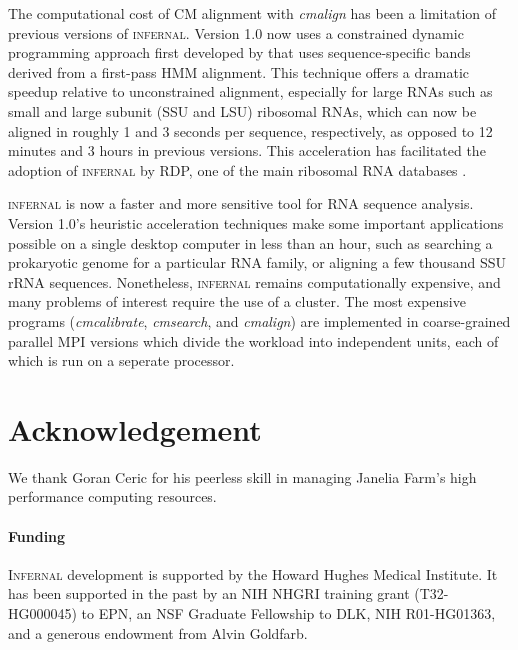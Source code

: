 \documentclass{bioinfo}
\begin{document}
\begin{application}
The computational cost of CM alignment with \emph{cmalign} has been a
limitation of previous versions of \textsc{infernal}. Version 1.0 now
uses a constrained dynamic programming approach first developed by
\citet{Brown00} that uses sequence-specific bands derived from a
first-pass HMM alignment. This technique offers a dramatic speedup
relative to unconstrained alignment, especially for large RNAs such as
small and large subunit (SSU and LSU) ribosomal RNAs, which can now be
aligned in roughly 1 and 3 seconds per sequence, respectively, as
opposed to 12 minutes and 3 hours in previous versions.  This
acceleration has facilitated the adoption of \textsc{infernal} by RDP,
one of the main ribosomal RNA databases \citep{Cole09}.

\textsc{infernal} is now a faster and more sensitive tool for RNA
sequence analysis.  Version 1.0's heuristic acceleration techniques
make some important applications possible on a single desktop computer
in less than an hour, such as searching a prokaryotic genome for a
particular RNA family, or aligning a few thousand SSU rRNA sequences.
Nonetheless, \textsc{infernal} remains computationally expensive, and many
problems of interest require the use of a cluster.  The most expensive
programs (\emph{cmcalibrate}, \emph{cmsearch}, and \emph{cmalign}) are
implemented in coarse-grained parallel MPI versions which divide the
workload into independent units, each of which is run on a seperate
processor. 


\section*{Acknowledgement}

We thank Goran Ceric for his peerless skill in managing Janelia Farm's
high performance computing resources.

\paragraph*{Funding\textcolon} 
\textsc{Infernal} development is supported by the Howard Hughes
Medical Institute. It has been supported in the past by an NIH NHGRI
training grant (T32-HG000045) to EPN, an NSF Graduate Fellowship to
DLK, NIH R01-HG01363, and a generous endowment from Alvin Goldfarb.



\end{application}
\end{document}
